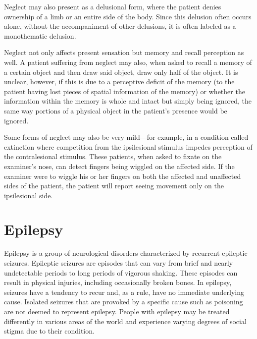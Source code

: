 Neglect may also present as a delusional form, where the patient denies
ownership of a limb or an entire side of the body. Since this delusion
often occurs alone, without the accompaniment of other delusions, it is
often labeled as a monothematic delusion.

Neglect not only affects present sensation but memory and recall
perception as well. A patient suffering from neglect may also, when
asked to recall a memory of a certain object and then draw said object,
draw only half of the object. It is unclear, however, if this is due to
a perceptive deficit of the memory (to the patient having lost pieces of
spatial information of the memory) or whether the information within the
memory is whole and intact but simply being ignored, the same way
portions of a physical object in the patient's presence would be
ignored.

Some forms of neglect may also be very mild---for example, in a
condition called extinction where competition from the ipsilesional
stimulus impedes perception of the contralesional stimulus. These
patients, when asked to fixate on the examiner's nose, can detect
fingers being wiggled on the affected side. If the examiner were to
wiggle his or her fingers on both the affected and unaffected sides of
the patient, the patient will report seeing movement only on the
ipsilesional side.

\hypertarget{epilepsy}{%
\section{Epilepsy}\label{epilepsy}}

Epilepsy is a group of neurological disorders characterized by recurrent
epileptic seizures. Epileptic seizures are episodes that can vary from
brief and nearly undetectable periods to long periods of vigorous
shaking. These episodes can result in physical injuries, including
occasionally broken bones. In epilepsy, seizures have a tendency to
recur and, as a rule, have no immediate underlying cause. Isolated
seizures that are provoked by a specific cause such as poisoning are not
deemed to represent epilepsy. People with epilepsy may be treated
differently in various areas of the world and experience varying degrees
of social stigma due to their condition.

